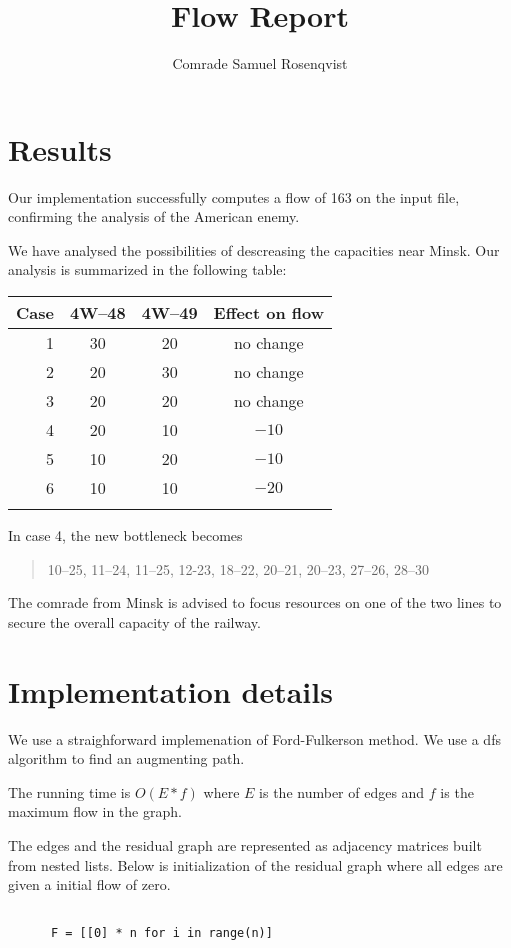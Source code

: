 \documentclass{tufte-handout}
\title{Flow Report}
\author{Comrade Samuel Rosenqvist}
\begin{document}
  \maketitle

  \section{Results}

  Our implementation successfully computes a flow of 163 on the input file, confirming the analysis of the American enemy.
  

  We have analysed the possibilities of descreasing the capacities near Minsk.
  Our analysis is summarized in the following table:
  

\bigskip
  \begin{tabular}{rccc}\toprule
    Case & 4W--48 & 4W--49 & Effect on flow \\\midrule
    1& 30& 20 & no change \\
    2& 20 &30 & no change \\
    3&20 & 20& no change \\
    4&20 & 10& $-10$ \\
    5&10 & 20& $-10$ \\ 
    6&10 & 10& $-20$ \\ \\\bottomrule
  \end{tabular}
  \bigskip

  In case 4, the new bottleneck becomes
  \begin{quote}
      10--25, 11--24, 11--25, 12-23, 18--22, 20--21, 20--23, 27--26, 28--30
  \end{quote}
  The comrade from Minsk is advised to focus resources on one of the two lines to secure the overall capacity of the railway. 

  \section{Implementation details}

  We use a straighforward implemenation of Ford-Fulkerson method.
  We use a dfs algorithm to find an augmenting path.

  The running time is $O(E*f)$ where $E$ is the number of edges and $f$ is the maximum flow in the graph.

  The edges and the residual graph are represented as adjacency matrices built from nested lists.
  Below is initialization of the residual graph where all edges are given a initial flow of zero.
  
  \begin{verbatim}
    
      F = [[0] * n for i in range(n)]
    
  \end{verbatim}
\end{document}
